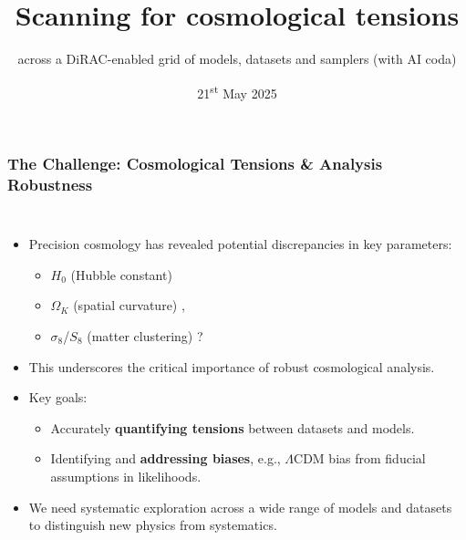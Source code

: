 \documentclass[aspectratio=169]{beamer}
\title{Scanning for cosmological tensions}
\subtitle{across a DiRAC-enabled grid of models, datasets and samplers (with AI coda)}
\date{21\textsuperscript{st} May 2025}
\begin{document}
\begin{frame}
    \titlepage
\end{frame}

\begin{frame}
    \frametitle{The Challenge: Cosmological Tensions \& Analysis Robustness}
    \begin{columns}[T]
        \begin{itemize}
            \item Precision cosmology has revealed potential discrepancies in key parameters:
                \begin{itemize}
                    \item $H_0$ (Hubble constant) 
                    \item $\Omega_K$ (spatial curvature) , 
                    \item $\sigma_8$/$S_8$ (matter clustering) ?
                \end{itemize}
            \item This underscores the critical importance of robust cosmological analysis.
            \item Key goals:
                \begin{itemize}
                    \item Accurately \textbf{quantifying tensions} between datasets and models.
                    \item Identifying and \textbf{addressing biases}, e.g., $\Lambda$CDM bias from fiducial assumptions in likelihoods.
                \end{itemize}
            \item We need systematic exploration across a wide range of models and datasets to distinguish new physics from systematics.
        \end{itemize}


\end{columns}
\end{frame}
\end{document}

